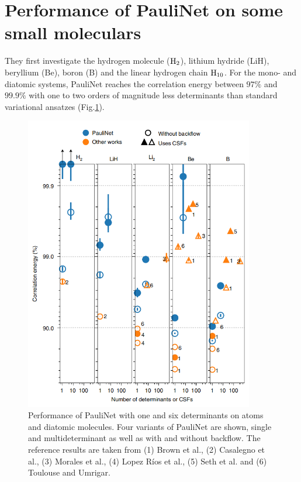 \documentclass[12pt]{article}
\begin{document}
\section{\large Performance of PauliNet on some small moleculars}
They first investigate the hydrogen molecule ($\rm H_2$), lithium hydride (LiH), 
beryllium (Be), boron (B) and the linear hydrogen chain $\rm H_{10}$. For the 
mono- and diatomic systems, PauliNet reaches the correlation energy between 
$97\%$ and $99.9\%$ with one to two orders of magnitude less determinants than 
standard variational ansatzes (Fig.\ref{img3}).
\begin{figure}[H]
    \centering
    \includegraphics[width=10cm]{p3.png}
    \renewcommand{\figurename}{Fig.}
    \caption{Performance of PauliNet with one and six determinants on atoms and 
    diatomic molecules. Four variants of PauliNet are shown, single and 
    multideterminant as well as with and without backflow. The reference 
    results are taken from (1) Brown et al., (2) Casalegno et al., (3) Morales 
    et al., (4) Lopez Ríos et al., (5) Seth et al. and (6) Toulouse and Umrigar.}
    \label{img3}
\end{figure}
\end{document}
